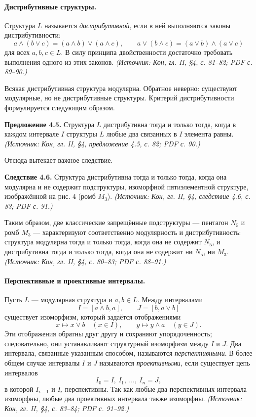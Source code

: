 \documentclass[a4paper,12pt]{article}
\begin{document}
\paragraph{Дистрибутивные структуры.}
Структура \(L\) называется \emph{дистрибутивной}, если в ней выполняются законы дистрибутивности:
\[
a\wedge(b\vee c)=(a\wedge b)\vee(a\wedge c),
\qquad
a\vee(b\wedge c)=(a\vee b)\wedge(a\vee c)
\]
для всех \(a,b,c\in L\). В силу принципа двойственности достаточно требовать выполнения одного из этих законов.
\textit{(Источник: Кон, гл. II, §4, с. 81--82; PDF с. 89--90.)}

Всякая дистрибутивная структура модулярна. Обратное неверно: существуют модулярные, но не дистрибутивные структуры. Критерий дистрибутивности формулируется следующим образом.

\textbf{Предложение 4.5.} Структура \(L\) дистрибутивна тогда и только тогда, когда в каждом интервале \(I\) структуры \(L\) любые два связанных в \(I\) элемента равны.
\textit{(Источник: Кон, гл. II, §4, предложение 4.5, с. 82; PDF с. 90.)}

Отсюда вытекает важное следствие.

\textbf{Следствие 4.6.} Структура дистрибутивна тогда и только тогда, когда она модулярна и не содержит подструктуры, изоморфной пятиэлементной структуре, изображённой на рис. 4 (ромб \(M_3\)).
\textit{(Источник: Кон, гл. II, §4, следствие 4.6, с. 83; PDF с. 91.)}

Таким образом, две классические запрещённые подструктуры — пентагон \(N_5\) и ромб \(M_3\) — характеризуют соответственно модулярность и дистрибутивность: структура модулярна тогда и только тогда, когда она не содержит \(N_5\), и дистрибутивна тогда и только тогда, когда она не содержит ни \(N_5\), ни \(M_3\).
\textit{(Источник: Кон, гл. II, §4, с. 80--83; PDF с. 88--91.)}

\paragraph{Перспективные и проективные интервалы.}
Пусть \(L\) — модулярная структура и \(a,b\in L\). Между интервалами
\[
I=[a\wedge b,a],\qquad J=[b,a\vee b]
\]
существует изоморфизм, который задаётся отображениями
\[
x\mapsto x\vee b\quad(x\in I),
\qquad
y\mapsto y\wedge a\quad(y\in J).
\]
Эти отображения обратны друг другу и сохраняют упорядоченность; следовательно, они устанавливают структурный изоморфизм между \(I\) и \(J\). Два интервала, связанные указанным способом, называются \emph{перспективными}. В более общем случае интервалы \(I\) и \(J\) называются \emph{проективными}, если существует цепь интервалов
\[
I_0=I,\ I_1,\ \ldots,\ I_n=J,
\]
в которой \(I_{i-1}\) и \(I_i\) перспективны. Так как любые два перспективных интервала изоморфны, любые два проективных интервала также изоморфны.
\textit{(Источник: Кон, гл. II, §4, с. 83--84; PDF с. 91--92.)}
\end{document}
